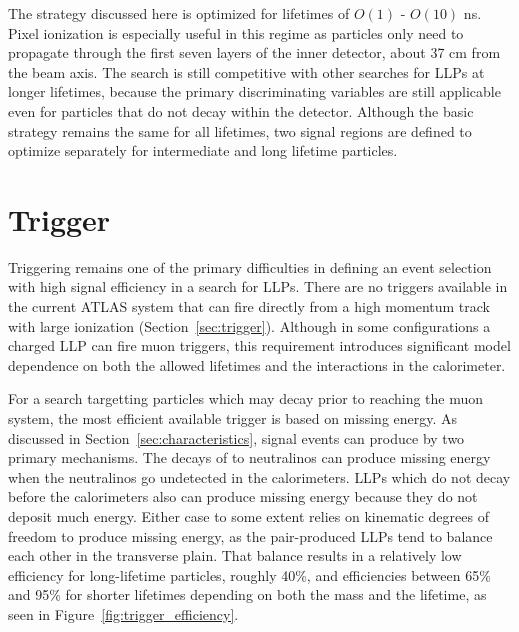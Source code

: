 The strategy discussed here is optimized for lifetimes of $O(1)$ - $O(10)$ ns. 
Pixel ionization is especially useful in this regime as particles only need to propagate through the first seven layers of the inner detector, about 37 cm from the beam axis. 
The search is still competitive with other searches for \acp{LLP} at longer lifetimes, because the primary discriminating variables are still applicable even for particles that do not decay within the detector. 
Although the basic strategy remains the same for all lifetimes, two signal regions are defined to optimize separately for intermediate and long lifetime particles.



\section{Trigger}

Triggering remains one of the primary difficulties in defining an event selection with high signal efficiency in a search for \acp{LLP}. 
There are no triggers available in the current ATLAS system that can fire directly from a high momentum track with large ionization (Section~\ref{sec:trigger}). 
Although in some configurations a charged \ac{LLP} can fire muon triggers, this requirement introduces significant model dependence on both the allowed lifetimes and the interactions in the calorimeter.

For a search targetting particles which may decay prior to reaching the muon system, the most efficient available trigger is based on missing energy.
As discussed in Section~\ref{sec:characteristics}, signal events can produce \met by two primary mechanisms.
The decays of \rhadrons to neutralinos can produce missing energy when the neutralinos go undetected in the calorimeters.
\acp{LLP} which do not decay before the calorimeters also can produce missing energy because they do not deposit much energy. 
Either case to some extent relies on kinematic degrees of freedom to produce missing energy, as the pair-produced \acp{LLP} tend to balance each other in the transverse plain.
That balance results in a relatively low efficiency for long-lifetime particles, roughly 40\%, and efficiencies between 65\% and 95\% for shorter lifetimes depending on both the mass and the lifetime, as seen in Figure~\ref{fig:trigger_efficiency}. 

